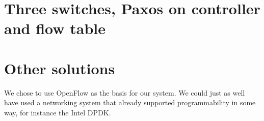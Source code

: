 
\section{Three switches, Paxos on controller and flow table}


\section{Other solutions}

We chose to use OpenFlow as the basis for our system.
We could just as well have used a networking system that already supported
programmability in some way, for instance the Intel DPDK.

